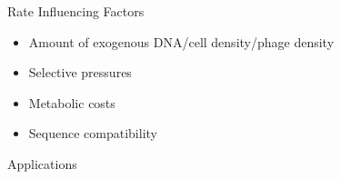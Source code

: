 \documentclass[dvipsnames]{beamer}
\begin{document}
\begin{frame}[fragile]{Rate Influencing Factors}
    \begin{itemize}
        \item<2-> Amount of exogenous DNA/cell density/phage density
        \item<3-> Selective pressures
        \item<4-> Metabolic costs
        \item<5-> Sequence compatibility
    \end{itemize}
\end{frame}
\begin{frame}[fragile]{Applications}
    \begin{figure}[htb!]
        \autocite{argspread}
    \end{figure}
\end{frame}
\end{document}
